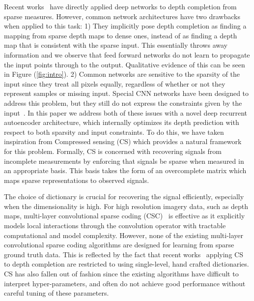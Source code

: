Recent works~\cite{sparsetodense,uhrig} have directly applied deep networks to depth completion from sparse measures. However, common network architectures have two drawbacks when applied to this task: 1) They implicitly pose depth completion as finding a mapping from sparse depth maps to dense ones, instead of as finding a depth map that is consistent with the sparse input. This essentially throws away information and we observe that feed forward networks do not learn to propagate the input points through to the output. Qualitative evidence of this can be seen in Figure (\ref{fig:intro}). 2) Common networks are sensitive to the sparsity of the input since they treat all pixels equally, regardless of whether or not they represent samples or missing input. Special CNN networks have been designed to address this problem, but they still do not express the constraints given by the input~\cite{uhrig}. In this paper we address both of these issues with a novel deep recurrent autoencoder architecture, which internally optimizes its depth prediction with respect to both sparsity and input constraints.
To do this, we have taken inspiration from Compressed sensing (CS) which provides a natural framework for this problem. Formally, CS is concerned with recovering signals from incomplete measurements by enforcing that signals be sparse when measured in an appropriate basis. This basis takes the form of an overcomplete matrix which maps sparse representations to observed signals.

The choice of dictionary is crucial for recovering the signal efficiently, especially when the dimensionality is high. For high resolution imagery data, such as depth maps, multi-layer convolutional sparse coding (CSC)~\cite{papyan} is effective as it explicitly models local interactions through the convolution operator with tractable computational and model complexity. However, none of the existing multi-layer convolutional sparse coding algorithms are designed for learning from sparse ground truth data. This is reflected by the fact that recent works~\cite{hawe2011dense,liu2015depth} applying CS to depth completion are restricted to using single-level, hand crafted dictionaries. CS has also fallen out of fashion since the existing algorithms have difficult to interpret hyper-parameters, and often do not achieve good performance without careful tuning of these parameters.

